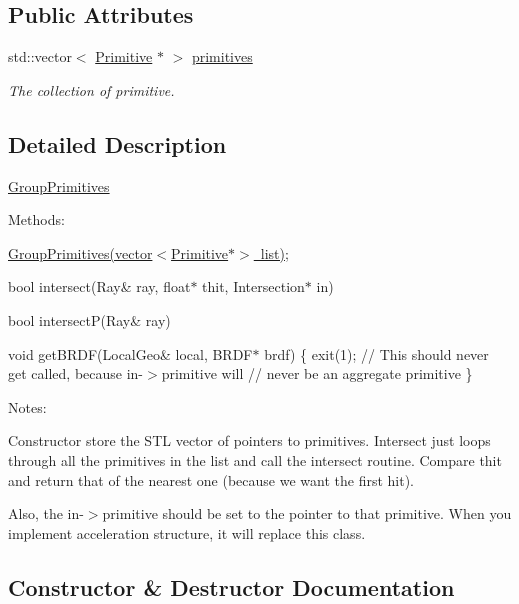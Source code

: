 \subsection*{Public Attributes}
\begin{DoxyCompactItemize}
\item 
\mbox{\label{class_group_primitives_a694241c5449d75ea29669e4cc7d93d32}} 
std\+::vector$<$ \mbox{\hyperlink{class_primitive}{Primitive}} $\ast$ $>$ \mbox{\hyperlink{class_group_primitives_a694241c5449d75ea29669e4cc7d93d32}{primitives}}
\begin{DoxyCompactList}\small\item\em The collection of primitive. \end{DoxyCompactList}\end{DoxyCompactItemize}


\subsection{Detailed Description}
\mbox{\hyperlink{class_group_primitives}{Group\+Primitives}}

Methods\+:

\mbox{\hyperlink{class_group_primitives}{Group\+Primitives(vector$<$\+Primitive$\ast$$>$ list)}};

bool intersect(\+Ray\& ray, float$\ast$ thit, Intersection$\ast$ in)

bool intersect\+P(\+Ray\& ray)

void get\+B\+R\+D\+F(\+Local\+Geo\& local, B\+R\+D\+F$\ast$ brdf) \{ exit(1); // This should never get called, because in-\/$>$primitive will // never be an aggregate primitive \}

Notes\+:

Constructor store the S\+TL vector of pointers to primitives. Intersect just loops through all the primitives in the list and call the intersect routine. Compare thit and return that of the nearest one (because we want the first hit).

Also, the in-\/$>$primitive should be set to the pointer to that primitive. When you implement acceleration structure, it will replace this class. 

\subsection{Constructor \& Destructor Documentation}
\mbox{\label{class_group_primitives_ad09cb3eb5220543a5edf1f85a38e7244}} 
